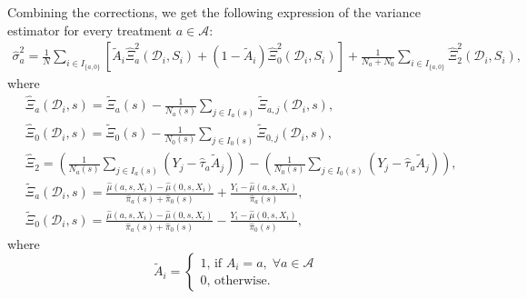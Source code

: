 \documentclass{article}
\begin{document}
Combining the corrections, we get the following expression of the variance estimator for every treatment $a \in \mathcal A$:
\begin{align}
	\hat{\sigma}_a^2 = \frac{1}{N} \sum_{i \in I_{\{a,0\}}} \left[\tilde{A}_i\hat{\Xi}_{a}^2(\mathcal D_i, S_i) + (1-\tilde{A}_i) \hat{\Xi}_{0}^2(\mathcal D_i, S_i)\right] + \frac{1}{N_a + N_0} \sum_{i \in I_{\{a,0\}}}\hat{\Xi}_2^2(\mathcal D_i, S_i), \nonumber
\end{align}
where 
\begin{align}
	&\hat{\Xi}_{a}(\mathcal D_i, s) = \tilde{\Xi}_{a}(s) - \frac{1}{N_a(s)} \sum_{j \in I_a(s)} \tilde{\Xi}_{a,j}(\mathcal D_i, s) \nonumber, \\
	&\hat{\Xi}_{0}(\mathcal D_i, s) = \tilde{\Xi}_{0}(s) - \frac{1}{N_0(s)} \sum_{j \in I_0(s)} \tilde{\Xi}_{0,j}(\mathcal D_i, s) \nonumber , \\
	& \hat{\Xi}_2 = \left(\frac{1}{N_a(s)} \sum_{j \in I_a(s)} (Y_j - \hat{\tau}_a \tilde{A}_j) \right) - \left(\frac{1}{N_0(s)} \sum_{j \in I_0(s)} (Y_j - \hat{\tau}_a  \tilde{A}_j)\right), \nonumber \\
	& \tilde{\Xi}_a(\mathcal D_i,s) = \frac{\hat{\mu}(a,s,X_i) - \hat{\mu}(0,s,X_i)}{\hat{\pi}_a(s) + \hat{\pi}_0(s)} + \frac{Y_i - \hat{\mu}(a,s,X_i)}{\hat{\pi}_a(s)}, \nonumber \\
& \tilde{\Xi}_0(\mathcal D_i,s) = \frac{\hat{\mu}(a,s,X_i) - \hat{\mu}(0,s,X_i)}{\hat{\pi}_a(s) + \hat{\pi}_0(s)} - \frac{Y_i - \hat{\mu}(0,s,X_i)}{\hat{\pi}_0(s)} , \nonumber
\end{align}
where 
\[\tilde{A}_i = \begin{cases}1\text{, if }A_i = a,\; \forall a \in \mathcal A \\ 0\text{, otherwise.}\end{cases}\]
\end{document}
